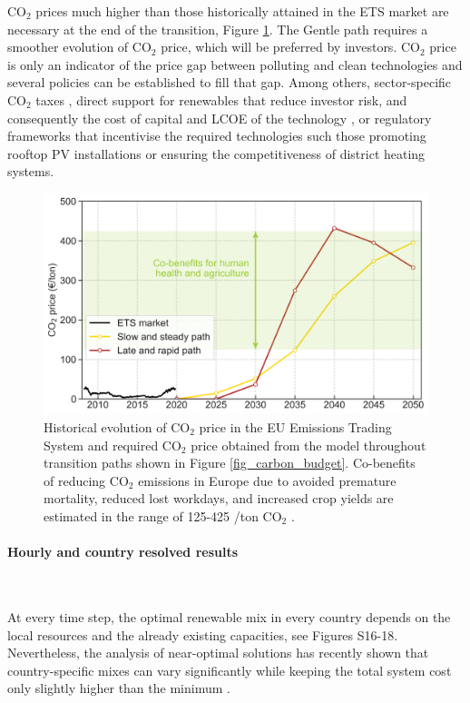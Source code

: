 \documentclass[5p]{elsarticle} %
\begin{document}
CO$_2$ prices much higher than those historically attained in the ETS market are necessary at the end of the transition, Figure \ref{fig_co2price}. The Gentle path requires a smoother evolution of CO$_2$ price, which will be preferred by investors. CO$_2$ price is only an indicator of the price gap between polluting and clean technologies and several policies can be established to fill that gap. Among others, sector-specific CO$_2$ taxes \cite{Carbon_pricing_2019}, direct support for renewables that reduce investor risk, and consequently the cost of capital and LCOE of the technology \cite{Vartiainen_2019}, or regulatory frameworks that incentivise the required technologies such those promoting rooftop PV installations or ensuring the competitiveness of district heating systems. 

\begin{figure}[!h]
\centering
\includegraphics[width=\columnwidth]{../figures/co2_price.png}
\caption{Historical evolution of CO$_2$ price in the EU Emissions Trading System \cite{ETS} and required CO$_2$ price obtained from the model throughout transition paths shown in Figure \ref{fig_carbon_budget}. 
Co-benefits of reducing CO$_2$ emissions in Europe due to avoided premature mortality, reduced lost workdays, and increased crop yields are estimated in the range of 125-425 \EUR/ton CO$_2$ \cite{Vandyck_2018}.} \label{fig_co2price} 
\end{figure}

\paragraph{\textbf{Hourly and country resolved results}} \

At every time step, the optimal renewable mix in every country depends on the local resources and the already existing capacities, see Figures S16-18. Nevertheless, the analysis of near-optimal solutions has recently shown that country-specific mixes can vary significantly while keeping the total system cost only slightly higher than the minimum \cite{Neumann_2019}. \\
\end{document}
